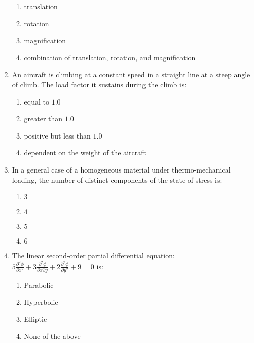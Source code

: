 \documentclass[journal]{IEEEtran}
\begin{document}
\begin{enumerate}[start=1]
\begin{enumerate}
    \item translation
    \item rotation
    \item magnification
    \item combination of translation, rotation, and magnification
\end{enumerate}

\item An aircraft is climbing at a constant speed in a straight line at a steep angle of climb. The load factor it sustains during the climb is:

\begin{multicols}{2}
\begin{enumerate}
    \item equal to $1.0$
    \item greater than $1.0$
    \item positive but less than $1.0$
    \item dependent on the weight of the aircraft
\end{enumerate}
\end{multicols}

\item In a general case of a homogeneous material under thermo-mechanical loading, the number of distinct components of the state of stress is:
\begin{multicols}{4}
\begin{enumerate}
    \item $3$ 
    \item $4$ 
    \item $5$ 
    \item $6$
\end{enumerate}
\end{multicols}

\item The linear second-order partial differential equation:
$5 \frac{\partial^2 \phi}{\partial x^2} + 3 \frac{\partial^2 \phi}{\partial x \partial y} + 2 \frac{\partial^2 \phi}{\partial y^2} + 9 = 0$ is:
\begin{multicols}{2}
\begin{enumerate}
    \item Parabolic
    \item Hyperbolic
    \item Elliptic
    \item None of the above
\end{enumerate}
\end{multicols}


\end{enumerate}
\end{document}
